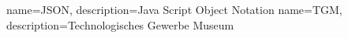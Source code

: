 \makeglossaries
{} {name=JSON, description={Java Script Object Notation}}
 {name=TGM, description={Technologisches Gewerbe Museum}}

\renewcommand*\glspostdescription{\dotfill}

